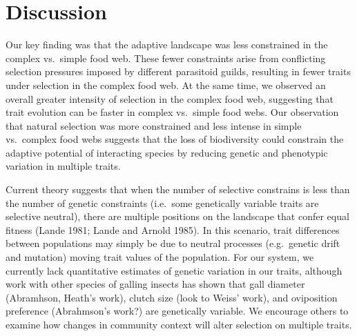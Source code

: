 \documentclass[]{elsarticle} %
\begin{document}
\section{Discussion}\label{discussion}

Our key finding was that the adaptive landscape was less constrained in
the complex vs.~simple food web. These fewer constraints arise from
conflicting selection pressures imposed by different parasitoid guilds,
resulting in fewer traits under selection in the complex food web. At
the same time, we observed an overall greater intensity of selection in
the complex food web, suggesting that trait evolution can be faster in
complex vs.~simple food webs. Our observation that natural selection was
more constrained and less intense in simple vs.~complex food webs
suggests that the loss of biodiversity could constrain the adaptive
potential of interacting species by reducing genetic and phenotypic
variation in multiple traits.

Current theory suggests that when the number of selective constrains is
less than the number of genetic constraints (i.e.~some genetically
variable traits are selective neutral), there are multiple positions on
the landscape that confer equal fitness (Lande 1981; Lande and Arnold
1985). In this scenario, trait differences between populations may
simply be due to neutral processes (e.g.~genetic drift and mutation)
moving trait values of the population. For our system, we currently lack
quantitative estimates of genetic variation in our traits, although work
with other species of galling insects has shown that gall diameter
(Abramhson, Heath's work), clutch size (look to Weiss' work), and
oviposition preference (Abrahmson's work?) are genetically variable. We
encourage others to examine how changes in community context will alter
selection on multiple traits.
\end{document}
